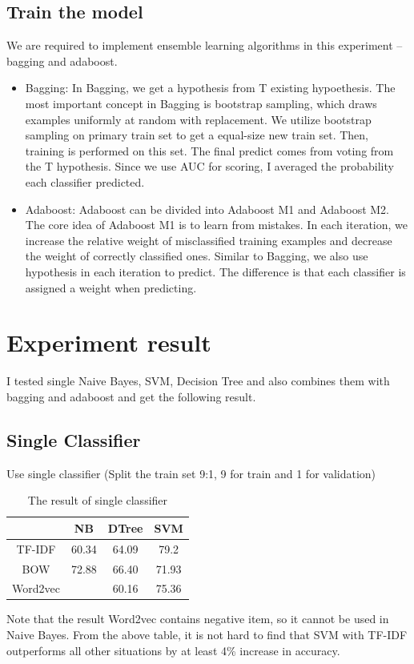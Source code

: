 \documentclass[paper=a4, fontsize=11pt, UTF8]{article} %
\begin{document}
\subsection{Train the model}
We are required to implement ensemble learning algorithms in this experiment -- bagging and adaboost. 
\begin{itemize}
    \item Bagging: In Bagging, we get a hypothesis from T existing hypoethesis. The most important concept in Bagging is bootstrap sampling, which draws examples uniformly at random with replacement. We utilize bootstrap sampling on primary train set to get a equal-size new train set.  Then, training is performed on this set. The final predict comes from voting from the T hypothesis. Since we use AUC for scoring, I averaged the probability each classifier predicted.
    \item Adaboost: Adaboost can be divided into Adaboost M1 and Adaboost M2. The core idea of Adaboost M1 is to learn from mistakes. In each iteration, we increase the relative weight of misclassified training examples and decrease the weight of correctly classified ones. Similar to Bagging, we also use hypothesis in each iteration to predict. The difference is that each classifier is assigned a weight when predicting.
\end{itemize}

\section{Experiment result}

I tested single Naive Bayes, SVM, Decision Tree and also combines them with bagging and adaboost and get the following result.

\subsection{Single Classifier}
Use single classifier (Split the train set 9:1, 9 for train and 1 for validation)
\begin{table}[H]
\centering
\begin{tabular}{|@{}c|c|c|c|}
	\hline
	\diagbox[width=8em,trim=l]{Method}{Classifier} & NB & DTree & SVM\\
	\hline
    TF-IDF & 60.34 & 64.09 & 79.2\\
    \hline
    BOW & 72.88 & 66.40 & 71.93\\
    \hline
    Word2vec & & 60.16 & 75.36\\
    \hline
\end{tabular}
\label{table1}
\caption{The result of single classifier}
\end{table}
Note that the result Word2vec contains negative item, so it cannot be used in Naive Bayes. From the above table, it is not hard to find that SVM with TF-IDF outperforms all other situations by at least 4\% increase in accuracy. 
\end{document}
